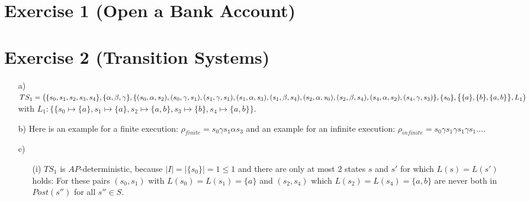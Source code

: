 \documentclass[a4paper,11pt]{scrartcl}
\begin{document}
	
	\section*{Exercise 1 (Open a Bank Account)}
	
	
	\section*{Exercise 2 (Transition Systems)}
	
	\begin{itemize}
		\item[a)] $ TS_1 = \bigl( \{s_0, s_1, s_2, s_3, s_4\}, \{\alpha,\beta, \gamma\}, \\
		\{ (s_0, \alpha, s_2), (s_0, \gamma, s_1), (s_1, \gamma, s_1), (s_1, \alpha, s_3), (s_1, \beta, s_4), (s_2, \alpha, s_0), (s_2, \beta, s_4), (s_4, \alpha, s_2), (s_4, \gamma, s_3)\},\\
		\{s_0\}, \bigl\{ \{a\}, \{b\}, \{a,b\} \bigr\}, L_1 \bigr)$\\
		with $L_1: \bigl\{ \{s_0 \mapsto \{a\}, s_1 \mapsto \{a\}, s_2 \mapsto \{a,b\}, s_3 \mapsto \{b\}, s_4 \mapsto \{a,b\} \bigr\}$.
		\item[b)] Here is an example for a finite execution: $\rho_{finite} = s_0 \gamma s_1 \alpha s_3$ and an example for an infinite execution: $\rho_{infinite} = s_0 \gamma s_1 \gamma s_1 \gamma s_1 \dots$.
		\item[c)]
		\begin{itemize}
			\item[(i)] $TS_1$ is $AP$-deterministic, because $\mid I \mid = \mid \{s_0\} \mid = 1 \leq 1$ and there are only at most 2 states $s$ and $s'$ for which $L(s)=L(s')$ holds: For these pairs $(s_0, s_1)$ with $L(s_0)=L(s_1)=\{a\}$ and $(s_2, s_4)$ which $L(s_2)=L(s_4)=\{a, b\}$ are never both in $Post(s'')$ for all $s'' \in S$.
			

\end{itemize}
\end{itemize}
\end{document}
